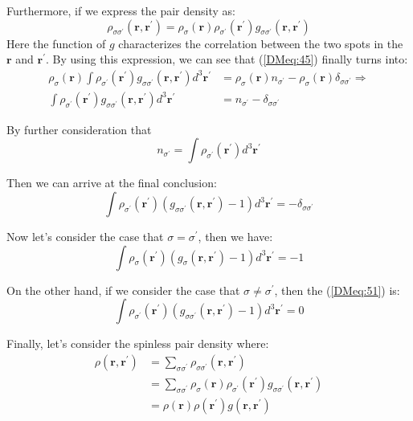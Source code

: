 Furthermore, if we express the pair density as:
\begin{equation}
  \label{DMeq:48}
  \rho_{\sigma\sigma^{'}}(\bm{r}, \bm{r^{'}}) =
  \rho_{\sigma}(\bm{r})\rho_{\sigma^{'}}(\bm{r^{'}})
  g_{\sigma\sigma^{'}}(\bm{r}, \bm{r^{'}})
\end{equation}
Here the function of $g$ characterizes the correlation between the two
spots in the $\bm{r}$ and $\bm{r^{'}}$. By using this expression, we
can see that (\ref{DMeq:45}) finally turns into:
\begin{equation}
  \label{DMeq:49}
  \begin{split}
    \rho_{\sigma}(\bm{r})\int\rho_{\sigma^{'}}(\bm{r^{'}})
  g_{\sigma\sigma^{'}}(\bm{r}, \bm{r^{'}})d^{3}\bm{r^{'}} &=
\rho_{\sigma}(\bm{r})n_{\sigma^{'}} -
\rho_{\sigma}(\bm{r})\delta_{\sigma\sigma^{'}} \Rightarrow \\
\int\rho_{\sigma^{'}}(\bm{r^{'}})
  g_{\sigma\sigma^{'}}(\bm{r}, \bm{r^{'}})d^{3}\bm{r^{'}} &=
n_{\sigma^{'}} - \delta_{\sigma\sigma^{'}}
  \end{split}
\end{equation}

By further consideration that
\begin{equation}
  \label{DMeq:50}
  n_{\sigma^{'}} = \int \rho_{\sigma^{'}}(\bm{r^{'}}) d^{3}\bm{r^{'}}
\end{equation}

Then we can arrive at the final conclusion:
\begin{equation}
  \label{DMeq:51}
  \int\rho_{\sigma^{'}}(\bm{r^{'}})
  (g_{\sigma\sigma^{'}}(\bm{r}, \bm{r^{'}}) - 1)d^{3}\bm{r^{'}} =
- \delta_{\sigma\sigma^{'}}
\end{equation}

Now let's consider the case that $\sigma = \sigma^{'}$, then we
have:
\begin{equation}\label{DMeq:52}
\int\rho_{\sigma}(\bm{r^{'}})
(g_{\sigma}(\bm{r}, \bm{r^{'}}) -
1)d^{3}\bm{r^{'}} = - 1
\end{equation}

On the other hand, if we consider the case that $\sigma \neq
\sigma^{'}$, then the (\ref{DMeq:51}) is:
\begin{equation}
\label{DMeq:53}
\int\rho_{\sigma^{'}}(\bm{r^{'}})
  (g_{\sigma\sigma^{'}}(\bm{r}, \bm{r^{'}}) - 1)d^{3}\bm{r^{'}} =
0
\end{equation}

Finally, let's consider the spinless pair density where:
\begin{align}\label{DMeq:54}
\rho(\bm{r}, \bm{r^{'}}) &=
\sum_{\sigma\sigma^{'}}\rho_{\sigma\sigma^{'}}(\bm{r}, \bm{r^{'}})
\nonumber \\
&=\sum_{\sigma\sigma^{'}}\rho_{\sigma}(\bm{r})
\rho_{\sigma^{'}}(\bm{r^{'}})g_{\sigma\sigma^{'}}(\bm{r},
\bm{r^{'}}) \nonumber \\
&=\rho(\bm{r}) \rho(\bm{r^{'}})g(\bm{r}, \bm{r^{'}})
\end{align}

